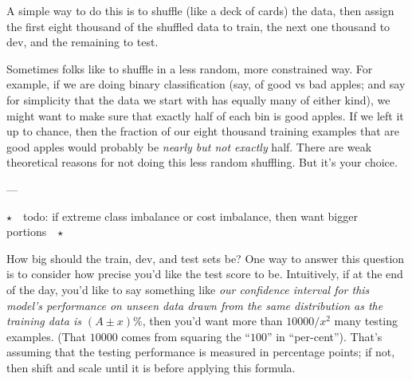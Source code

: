 \documentclass[11pt, justified]{tufte-book}
\newcommand{\attnsam}[1]{{\red $\star$~~\textsf{#1}~~$\star$}}
\newcommand{\samsubsubsection}[1]{
   \vspace{0.1cm}
   \par\noindent{\hspace{-2cm}\normalsize \sc \gre #1} ---
}
\theoremstyle{definition}
\begin{document}
        A simple way to do this is to shuffle (like a deck of cards) the data, then assign
        the first eight thousand of the shuffled data to train, the next one
        thousand to dev, and the remaining to test.

        Sometimes folks like to shuffle in a less random, more constrained
        way.  For example, if we are doing binary classification (say, of
        good vs bad apples; and say for simplicity that the data we start with
        has equally many of either kind), we might want to make sure that
        exactly half of each bin is good apples.  If we left it up to chance, 
        then the fraction of our eight thousand training examples that are good
        apples would probably be \emph{nearly but not exactly} half.
        There are weak theoretical reasons for not doing this less random
        shuffling.
        But it's your choice.

      \samsubsubsection{choosing portions}
        \attnsam{todo: if extreme class imbalance or cost imbalance, then want
        bigger portions}

        How big should the train, dev, and test sets be?  One way to answer
        this question is to consider how precise you'd like the test score to
        be.  Intuitively, if at the end of the day, you'd like to say something
        like \emph{our confidence interval for this model's performance on
        unseen data drawn from the same distribution as the training data is
        $(A\pm x)\%$}, then you'd want more than $10000/x^2$ many testing
        examples. %
          (That $10000$ comes from squaring the ``$100$'' in ``per-cent'').
        That's assuming that the testing performance is measured in
        percentage points; if not, then shift and scale until it is before
        applying
        this formula.
\end{document}
